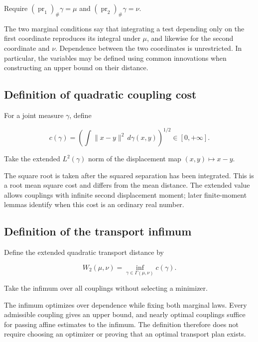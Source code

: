 \documentclass[11pt,a4paper]{article}
\begin{document}
Require \((\operatorname{pr}_1)_\#\gamma=\mu\) and \((\operatorname{pr}_2)_\#\gamma=\nu\).



The two marginal conditions say that integrating a test depending only on the first coordinate reproduces its integral under \(\mu\), and likewise for the second coordinate and \(\nu\). Dependence between the two coordinates is unrestricted. In particular, the variables may be defined using common innovations when constructing an upper bound on their distance.


\subsection{\texorpdfstring{Definition of quadratic coupling cost}{Definition of quadratic coupling cost}}


For a joint measure \(\gamma\), define

\[c(\gamma)=\left(\int\|x-y\|^2\,d\gamma(x,y)\right)^{1/2}\in[0,+\infty].\]

Take the extended \(L^2(\gamma)\) norm of the displacement map \((x,y)\mapsto x-y\).



The square root is taken after the squared separation has been integrated. This is a root mean square cost and differs from the mean distance. The extended value allows couplings with infinite second displacement moment; later finite-moment lemmas identify when this cost is an ordinary real number.


\subsection{\texorpdfstring{Definition of the transport infimum}{Definition of the transport infimum}}


Define the extended quadratic transport distance by

\[W_2(\mu,\nu)=\inf_{\gamma\in\Gamma(\mu,\nu)}c(\gamma).\]

Take the infimum over all couplings without selecting a minimizer.



The infimum optimizes over dependence while fixing both marginal laws. Every admissible coupling gives an upper bound, and nearly optimal couplings suffice for passing affine estimates to the infimum. The definition therefore does not require choosing an optimizer or proving that an optimal transport plan exists.
\end{document}

